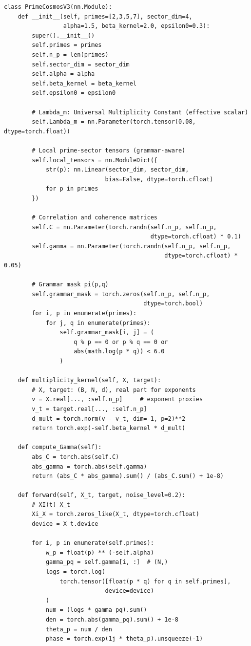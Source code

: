 \documentclass[11pt]{article}
\begin{document}
\begin{verbatim}
class PrimeCosmosV3(nn.Module):
    def __init__(self, primes=[2,3,5,7], sector_dim=4,
                 alpha=1.5, beta_kernel=2.0, epsilon0=0.3):
        super().__init__()
        self.primes = primes
        self.n_p = len(primes)
        self.sector_dim = sector_dim
        self.alpha = alpha
        self.beta_kernel = beta_kernel
        self.epsilon0 = epsilon0

        # Lambda_m: Universal Multiplicity Constant (effective scalar)
        self.Lambda_m = nn.Parameter(torch.tensor(0.08, dtype=torch.float))

        # Local prime-sector tensors (grammar-aware)
        self.local_tensors = nn.ModuleDict({
            str(p): nn.Linear(sector_dim, sector_dim,
                             bias=False, dtype=torch.cfloat)
            for p in primes
        })

        # Correlation and coherence matrices
        self.C = nn.Parameter(torch.randn(self.n_p, self.n_p,
                                          dtype=torch.cfloat) * 0.1)
        self.gamma = nn.Parameter(torch.randn(self.n_p, self.n_p,
                                              dtype=torch.cfloat) * 0.05)

        # Grammar mask pi(p,q)
        self.grammar_mask = torch.zeros(self.n_p, self.n_p,
                                        dtype=torch.bool)
        for i, p in enumerate(primes):
            for j, q in enumerate(primes):
                self.grammar_mask[i, j] = (
                    q % p == 0 or p % q == 0 or
                    abs(math.log(p * q)) < 6.0
                )

    def multiplicity_kernel(self, X, target):
        # X, target: (B, N, d), real part for exponents
        v = X.real[..., :self.n_p]     # exponent proxies
        v_t = target.real[..., :self.n_p]
        d_mult = torch.norm(v - v_t, dim=-1, p=2)**2
        return torch.exp(-self.beta_kernel * d_mult)

    def compute_Gamma(self):
        abs_C = torch.abs(self.C)
        abs_gamma = torch.abs(self.gamma)
        return (abs_C * abs_gamma).sum() / (abs_C.sum() + 1e-8)

    def forward(self, X_t, target, noise_level=0.2):
        # XI(t) X_t
        Xi_X = torch.zeros_like(X_t, dtype=torch.cfloat)
        device = X_t.device

        for i, p in enumerate(self.primes):
            w_p = float(p) ** (-self.alpha)
            gamma_pq = self.gamma[i, :]  # (N,)
            logs = torch.log(
                torch.tensor([float(p * q) for q in self.primes],
                             device=device)
            )
            num = (logs * gamma_pq).sum()
            den = torch.abs(gamma_pq).sum() + 1e-8
            theta_p = num / den
            phase = torch.exp(1j * theta_p).unsqueeze(-1)


\end{verbatim}
\end{document}
